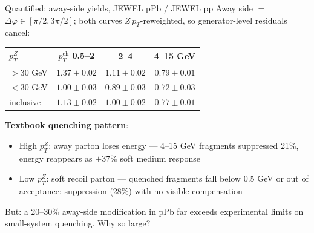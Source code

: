 \documentclass[aspectratio=169]{beamer}
\newcommand{\bad}[1]{{\color{red!70!black}#1}}
\begin{document}
\begin{frame}[t]{Quantified: away-side yields, JEWEL pPb / JEWEL pp}
  Away side $=$ $\Delta\varphi \in [\pi/2, 3\pi/2]$; both curves $Z\,p_T$-reweighted, so generator-level residuals cancel:
  \vspace{0.4em}
  \begin{center}
  \begin{tabular}{lccc}
    \toprule
    $p_T^Z$ & $p_T^\mathrm{ch}$ 0.5--2 & 2--4 & 4--15 GeV \\
    \midrule
    $>30$ GeV     & \bad{$1.37 \pm 0.02$} & $1.11 \pm 0.02$ & \bad{$0.79 \pm 0.01$} \\
    $<30$ GeV     & $1.00 \pm 0.03$       & $0.89 \pm 0.03$ & \bad{$0.72 \pm 0.03$} \\
    inclusive     & $1.13 \pm 0.02$       & $1.00 \pm 0.02$ & $0.77 \pm 0.01$ \\
    \bottomrule
  \end{tabular}
  \end{center}
  \vspace{0.5em}
  \textbf{Textbook quenching pattern}:
  \begin{itemize}
    \item High $p_T^Z$: away parton loses energy --- 4--15 GeV fragments suppressed 21\%, energy reappears as $+37\%$ soft medium response
    \item Low $p_T^Z$: soft recoil parton --- quenched fragments fall below 0.5 GeV or out of acceptance: suppression (28\%) with no visible compensation
  \end{itemize}
  \vspace{0.3em}
  \bad{But: a 20--30\% away-side modification in pPb far exceeds experimental limits on small-system quenching. Why so large?}
\end{frame}
\end{document}
